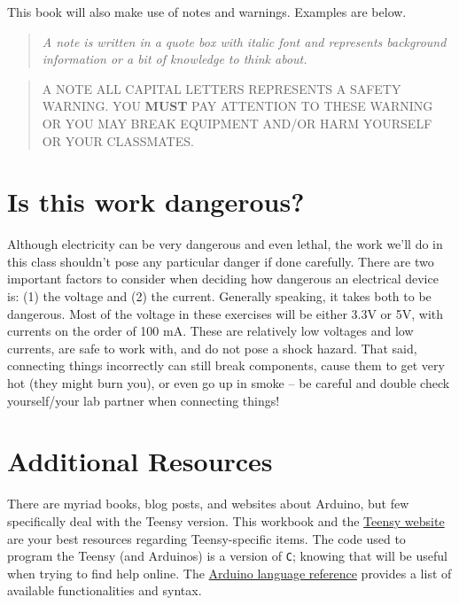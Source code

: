 \documentclass[]{book}
\begin{document}
This book will also make use of notes and warnings. Examples are below.

\begin{quote}
\emph{A note is written in a quote box with italic font and represents background information or a bit of knowledge to think about.}
\end{quote}

\begin{quote}
A NOTE ALL CAPITAL LETTERS REPRESENTS A SAFETY WARNING. YOU \textbf{MUST} PAY ATTENTION TO THESE WARNING OR YOU MAY BREAK EQUIPMENT AND/OR HARM YOURSELF OR YOUR CLASSMATES.
\end{quote}

\hypertarget{is-this-work-dangerous}{%
\section*{Is this work dangerous?}\label{is-this-work-dangerous}}

Although electricity can be very dangerous and even lethal, the work we'll do in this class shouldn't pose any particular danger if done carefully. There are two important factors to consider when deciding how dangerous an electrical device is: (1) the voltage and (2) the current. Generally speaking, it takes both to be dangerous. Most of the voltage in these exercises will be either 3.3V or 5V, with currents on the order of 100 mA. These are relatively low voltages and low currents, are safe to work with, and do not pose a shock hazard. That said, connecting things incorrectly can still break components, cause them to get very hot (they might burn you), or even go up in smoke -- be careful and double check yourself/your lab partner when connecting things!

\hypertarget{additional-resources}{%
\section*{Additional Resources}\label{additional-resources}}

There are myriad books, blog posts, and websites about Arduino, but few specifically deal with the Teensy version. This workbook and the \href{http://www.pjrc.com}{Teensy website} are your best resources regarding Teensy-specific items. The code used to program the Teensy (and Arduinos) is a version of \texttt{C}; knowing that will be useful when trying to find help online. The \href{https://www.arduino.cc/reference/en/}{Arduino language reference} provides a list of available functionalities and syntax.
\end{document}
